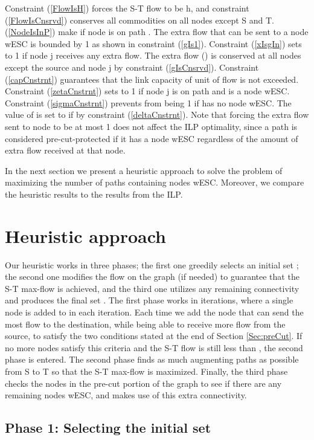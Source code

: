 \documentclass[conference]{IEEEtran}
\newcommand{\refeq}[1]{(\ref{#1})}
\begin{document}
Constraint \refeq{FlowIsH} forces the S-T flow to be h, and constraint \refeq{FlowIsCnsrvd} conserves all commodities on all nodes except S and T. \refeq{NodeIsInP} make  if node  is on path . The extra flow that can be sent to a node wESC is bounded by 1 as shown in constraint \refeq{gIs1}. Constraint \refeq{xIsgIn} sets  to 1 if node j receives any extra flow. The extra flow () is conserved at all nodes except the source and node j by constraint \refeq{gIsCnsrvd}. Constraint \refeq{capCnstrnt} guarantees that the link capacity of unit of flow is not exceeded. Constraint \refeq{zetaCnstrnt} sets  to 1 if node j is on path  and is a node wESC. Constraint  \refeq{sigmaCnstrnt} prevents  from being 1 if  has no node wESC. The value of  is set to  if  by constraint \refeq{deltaCnstrnt}. Note that forcing the extra flow  sent to node  to be at most 1 does not affect the ILP optimality, since a path is considered pre-cut-protected if it has a node wESC regardless of the amount of extra flow received at that node.


In the next section we present a heuristic approach to solve the problem of maximizing the number of paths containing nodes wESC. Moreover, we compare the heuristic results to the results from the ILP.

\section{Heuristic approach}
\label{Sec:Hrstc}

Our heuristic works in three phases; the first one greedily selects an initial set ; the second one modifies the flow on the graph (if needed) to guarantee that the S-T max-flow is achieved, and the third one utilizes any remaining connectivity and produces the final set . The first phase works in iterations, where a single node is added to  in each iteration. Each time we add the node that can send the most flow to the destination, while being able to receive more flow from the source, to satisfy the two conditions stated at the end of Section \ref{Sec:preCut}. If no more nodes satisfy this criteria and the S-T flow is still less than , the second phase is entered. The second phase finds as much augmenting paths as possible from S to T so that the S-T max-flow is maximized. Finally, the third phase checks the nodes in the pre-cut portion of the graph to see if there are any remaining nodes wESC, and makes use of this extra connectivity.

\subsection{Phase 1: Selecting the initial set }
\end{document}
